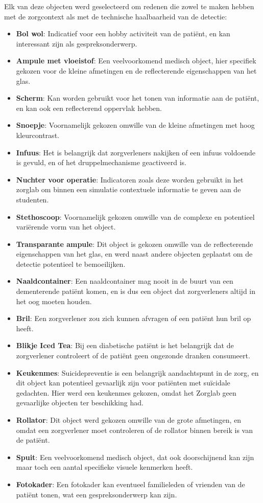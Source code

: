 Elk van deze objecten werd geselecteerd om redenen die zowel te maken hebben met de zorgcontext als met de technische haalbaarheid van de detectie:
\begin{itemize}
  \item \textbf{Bol wol}: Indicatief voor een hobby activiteit van de patiënt, en kan interessant zijn als gespreksonderwerp.
  \item \textbf{Ampule met vloeistof}: Een veelvoorkomend medisch object, hier specifiek gekozen voor de kleine afmetingen en de reflecterende eigenschappen van het glas.
  \item \textbf{Scherm}: Kan worden gebruikt voor het tonen van informatie aan de patiënt, en kan ook een reflecterend oppervlak hebben.
  \item \textbf{Snoepje}: Voornamelijk gekozen omwille van de kleine afmetingen met hoog kleurcontrast.
  \item \textbf{Infuus}: Het is belangrijk dat zorgverleners nakijken of een infuus voldoende is gevuld, en of het druppelmechanisme geactiveerd is.
  \item \textbf{Nuchter voor operatie}: Indicatoren zoals deze worden gebruikt in het zorglab om binnen een simulatie contextuele informatie te geven aan de studenten.
  \item \textbf{Stethoscoop}: Voornamelijk gekozen omwille van de complexe en potentieel variërende vorm van het object.
  \item \textbf{Transparante ampule}: Dit object is gekozen omwille van de reflecterende eigenschappen van het glas, en werd naast andere objecten geplaatst om de detectie potentieel te bemoeilijken.
  \item \textbf{Naaldcontainer}: Een naaldcontainer mag nooit in de buurt van een dementerende patiënt komen, en is dus een object dat zorgverleners altijd in het oog moeten houden.
  \item \textbf{Bril}: Een zorgverlener zou zich kunnen afvragen of een patiënt hun bril op heeft.
  \item \textbf{Blikje Iced Tea}: Bij een diabetische patiënt is het belangrijk dat de zorgverlener controleert of de patiënt geen ongezonde dranken consumeert.
  \item \textbf{Keukenmes}: Suicidepreventie is een belangrijk aandachtspunt in de zorg, en dit object kan potentieel gevaarlijk zijn voor patiënten met suïcidale gedachten. Hier werd een keukenmes gekozen, omdat het Zorglab geen gevaarlijke objecten ter beschikking had.
  \item \textbf{Rollator}: Dit object werd gekozen omwille van de grote afmetingen, en omdat een zorgverlener moet controleren of de rollator binnen bereik is van de patiënt.
  \item \textbf{Spuit}: Een veelvoorkomend medisch object, dat ook doorschijnend kan zijn maar toch een aantal specifieke visuele kenmerken heeft.
  \item \textbf{Fotokader}: Een fotokader kan eventueel familieleden of vrienden van de patiënt tonen, wat een gespreksonderwerp kan zijn.
\end{itemize}

